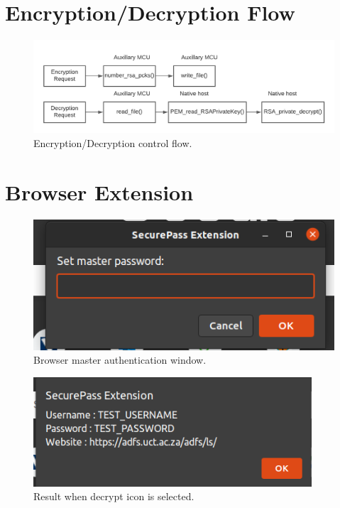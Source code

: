 \section{Encryption/Decryption Flow}
\label{sec:eflow}
\begin{figure}[H]
\centering
\includegraphics[width=1\columnwidth]{Figures/Fig_81.png}
\caption{Encryption/Decryption control flow.}
\label{fig:gantt}
\end{figure}

\section{Browser Extension}
\label{sec:bext1}
\begin{figure}[H]
\centering
\includegraphics[width=0.6\columnwidth]{Figures/Fig_82.png}
\caption{Browser master authentication window.}
\end{figure}

\label{sec:bext2}
\begin{figure}[H]
\centering
\includegraphics[width=0.55\columnwidth]{Figures/Fig_84.png}
\caption{Result when decrypt icon is selected.}
\end{figure}


